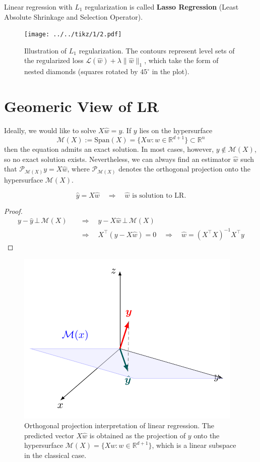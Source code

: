 \documentclass[../main]{subfiles}
\begin{document}
Linear regression with $L_1$ regularization is called \textbf{Lasso Regression} (Least Absolute Shrinkage and Selection Operator).
\begin{figure}[H]
  \centering
  \texttt{[image: ../../tikz/1/2.pdf]}
  \caption{Illustration of $L_1$ regularization. 
  The contours represent level sets of the regularized loss $\mathcal{L}(\hat w) + \lambda \|\hat w\|_1$, 
  which take the form of nested diamonds (squares rotated by $45^\circ$ in the plot). }
\end{figure}
\section{Geomeric View of LR}

Ideally, we would like to solve $X \hat w = y.$ If $y$ lies on the hypersurface 
\begin{equation}
	\mathcal{M}(X) :=\mathrm{Span}(X)= \{ X w : w \in \mathbb{R}^{d+1} \} \subset \mathbb{R}^n
\end{equation}
then the equation admits an exact solution. In most cases, however, $y \notin \mathcal{M}(X)$, so no exact solution exists. Nevertheless, we can always find an estimator $\hat w$ such that $\mathcal P_{\mathcal{M}(X)} y = X \hat w$, where $\mathcal P_{\mathcal{M}(X)}$ denotes the orthogonal projection onto the hypersurface $\mathcal{M}(X)$.
\begin{proposition}
  \begin{equation}
      \hat y=X\hat w\quad\Rightarrow\quad\hat w \text{ is solution to LR.}
  \end{equation}
\end{proposition}
\begin{proof}
  \begin{align*}
    y-\hat y\,\bot\, \mathcal{M}(X)\quad&\Rightarrow\quad y-X\hat w\,\bot\, \mathcal{M}(X)\\
    &\Rightarrow\quad X^\top(y-X\hat w)=0\quad\Rightarrow\quad \hat w=(X^\top X)^{-1}X^{\top}y
  \end{align*}
\end{proof}
\begin{figure}[H]
  \centering
  \includegraphics{../../tikz/1/3.pdf}
  \caption{Orthogonal projection interpretation of linear regression. 
The predicted vector $X\hat w$ is obtained as the projection of $y$ onto the hypersurface 
$\mathcal M(X)=\{Xw : w\in\mathbb{R}^{d+1}\}$, which is a linear subspace in the classical case.}
\end{figure}
\end{document}
